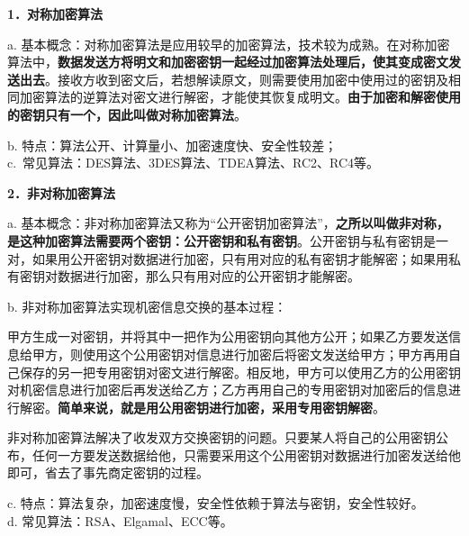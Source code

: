 \textbf{{1．对称加密算法}}

{a.
基本概念：对称加密算法是应用较早的加密算法，技术较为成熟。在对称加密算法中，}\textbf{数据发送方将明文和加密密钥一起经过加密算法处理后，使其变成密文发送出去}{。接收方收到密文后，若想解读原文，则需要使用加密中使用过的密钥及相同加密算法的逆算法对密文进行解密，才能使其恢复成明文。}\textbf{{由于加密和解密使用的密钥只有一个，因此叫做对称加密算法}}{。}

b. 特点：算法公开、计算量小、加密速度快、安全性较差；\\

c.~常见算法：DES算法、3DES算法、TDEA算法、RC2、RC4等。

\textbf{{2．非对称加密算法}}

a.
基本概念：非对称加密算法又称为``公开密钥加密算法''，\textbf{之所以叫做非对称，是这种加密算法需要两个密钥：公开密钥和私有密钥}。公开密钥与私有密钥是一对，如果用公开密钥对数据进行加密，只有用对应的私有密钥才能解密；如果用私有密钥对数据进行加密，那么只有用对应的公开密钥才能解密。

{b. 非对称加密算法实现机密信息交换的基本过程：}

甲方生成一对密钥，并将其中一把作为公用密钥向其他方公开；如果乙方要发送信息给甲方，则使用这个公用密钥对信息进行加密后将密文发送给甲方；甲方再用自己保存的另一把专用密钥对密文进行解密。相反地，甲方可以使用乙方的公用密钥对机密信息进行加密后再发送给乙方；乙方再用自己的专用密钥对加密后的信息进行解密。\textbf{{简单来说，就是用公用密钥进行加密，采用专用密钥解密}}。

非对称加密算法解决了收发双方交换密钥的问题。只要某人将自己的公用密钥公布，任何一方要发送数据给他，只需要采用这个公用密钥对数据进行加密发送给他即可，省去了事先商定密钥的过程。

c. 特点：算法复杂，加密速度慢，安全性依赖于算法与密钥，安全性较好。\\

d. 常见算法：RSA、Elgamal、ECC等。
